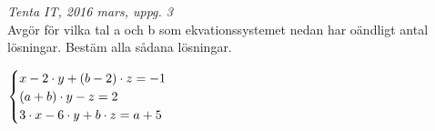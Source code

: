 \textit{Tenta IT, 2016 mars, uppg. 3} \\
Avgör för vilka tal a och b som ekvationssystemet nedan har oändligt antal lösningar. Bestäm alla sådana lösningar.

\begin{math}
	\begin{cases}
	x - 2 \cdot y  + (b - 2) \cdot z = -1 \\
	(a + b) \cdot y -z = 2 \\
	3 \cdot x - 6 \cdot y  + b \cdot z = a + 5 \\
	\end{cases}
	\\
	\\
\end{math}